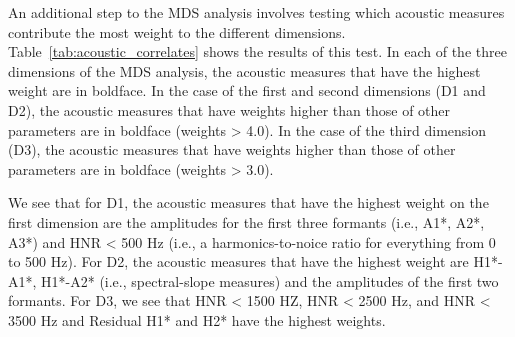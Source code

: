 An additional step to the MDS analysis involves testing which acoustic measures contribute the most weight to the different dimensions. Table~\ref{tab:acoustic_correlates} shows the results of this test. In each of the three dimensions of the MDS analysis, the acoustic measures that have the highest weight are in boldface. In the case of the first and second dimensions (D1 and D2), the acoustic measures that have weights higher than those of other parameters are in boldface (weights > 4.0). In the case of the third dimension (D3), the acoustic measures that have weights higher than those of other parameters are in boldface (weights > 3.0). 

We see that for D1, the acoustic measures that have the highest weight on the first dimension are the amplitudes for the first three formants (i.e., A1*, A2*, A3*) and HNR < 500 Hz (i.e., a harmonics-to-noice ratio for everything from 0 to 500 Hz). For D2, the acoustic measures that have the highest weight are H1*-A1*, H1*-A2* (i.e., spectral-slope measures) and the amplitudes of the first two formants. For D3, we see that HNR < 1500 HZ, HNR < 2500 Hz, and HNR < 3500 Hz and Residual H1* and H2* have the highest weights.

